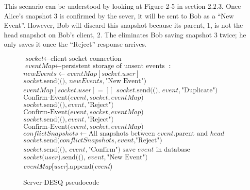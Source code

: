 This scenario can be understood by looking at Figure 2-5 in section 2.2.3. Once Alice's snapshot 3 is confirmed by the sever, it will be sent to Bob as a ``New Event''. However, Bob will discard this snapshot because its parent, 1, is not the head snapshot on Bob's client, 2. The eliminates Bob saving snapshot 3 twice; he only saves it once the ``Reject'' response arrives.

\begin{center}
\begin{figure}[h]
\begin{algorithmic}[1]
\State $\textit{socket} \gets \text{client socket connection}$
\State $\textit{eventMap} \gets \text{persistent storage of unsent events}$
:
\State $newEvents \gets eventMap[socket.user]$
\State $socket\text{.send((), }newEvents, \text{"New Event")}$
\State $eventMap[socket.user] = []$
\EndIf
{}
\State $socket\text{.send((), }event, \text{"Duplicate")}$
\State $\text{Confirm-Event(}event, socket, eventMap\text{)}$
\Else 
\State $socket\text{.send(()}, event, \text{"Reject")}$
\EndIf
{}
\State $\text{Confirm-Event(}event, socket, eventMap\text{)}$
\Else 
\State $socket\text{.send(()}, event, \text{"Reject")}$
\EndIf
\Else {}
\State $\text{Confirm-Event(}event, socket, eventMap\text{)}$
\Else
\State $conflictSnapshots \gets \text{All snapshots between }event\text{.parent and }head$
\State $socket\text{.send(}conflictSnapshots, event\text{,"Reject")}$
\EndIf
\EndIf
\EndWhile
\EndProcedure
{}
\State $socket\text{.send((), }event, \text{"Confirm")}$
\State $\text{save }event\text{ in database}$
\State $socket\text{(}user\text{).send((), }event, \text{"New Event")}$
\Else
\State \emph{eventMap}[\emph{user}].append(\emph{event})
\EndIf
\EndFor
\EndProcedure
\end{algorithmic}
\caption{Server-DESQ pseudocode}\label{euclid}
\end{figure}
\end{center}

